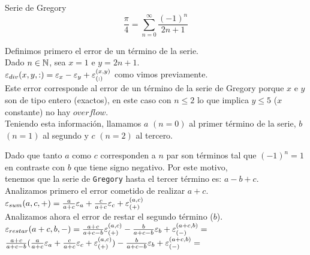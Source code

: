 \begin{subsubsection}{Serie de Gregory}
		\begin{equation*}
		\frac{\pi}{4} = \sum_{n=0}^{\infty} \frac{\left(-1\right)^n}{2n+1}
		\end{equation*}

	\VSP
	Definimos primero el error de un término de la serie.\\
		
	Dado $n \in \mathbb{N}$, sea $x=1$ e $y=2n+1$.\\
		
	$\varepsilon _{div}({x,y,:}) = \varepsilon _{x} - \varepsilon _{y} + \varepsilon _{({:})}^{({x,y})}$ como vimos previamente.\\
	
	Este error corresponde al error de un término de la serie de Gregory porque $x$ e $y$ son de tipo entero (exactos), en este caso con $n \leq 2$ lo que implica $y \leq 5$ ($x$ constante) no hay $overflow$.\\
	
	
	Teniendo esta información, llamamos $a$ $(n=0)$ al primer término de la serie, $b$ $(n=1)$ al segundo y $c$ $(n=2)$ al tercero.
	
	Dado que tanto $a$ como $c$ corresponden a $n$ par son términos tal que $(-1)^n = 1$ en contraste con $b$ que tiene signo negativo. Por este motivo,\\
	tenemos que la serie de \texttt{Gregory} hasta el tercer término es: $a - b + c$.\\
	
	Analizamos primero el error cometido de realizar $a+c$.\\
	
	$\varepsilon _{sum}({a,c,+}) = \frac{a}{a+c}\varepsilon _{a} + \frac{c}{a+c}\varepsilon _{c} + \varepsilon _{({+})}^{({a,c})}$\\
	
	Analizamos ahora el error de restar el segundo término ($b$).\\
		
	$\varepsilon _{restar}({a+c,b,-}) = \frac{a+c}{a+c-b}\varepsilon _{({+})}^{({a,c})} - \frac{b}{a+c-b}\varepsilon _{b} + \varepsilon _{({-})}^{({a+c,b})} =$\\
	
	$\frac{a+c}{a+c-b}(\frac{a}{a+c}\varepsilon _{a} + \frac{c}{a+c}\varepsilon _{c} + \varepsilon _{({+})}^{({a,c})}) - \frac{b}{a+c-b}\varepsilon _{b} + \varepsilon _{({-})}^{({a+c,b})} =$\\
	

\end{subsubsection}
